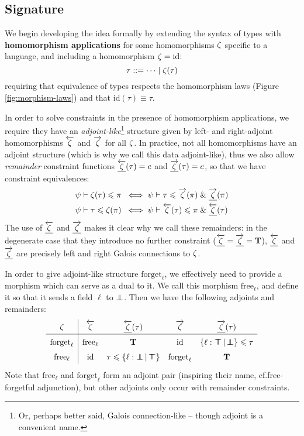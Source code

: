 \subsection{Signature}

We begin developing the idea formally by extending the syntax of types with \textbf{homomorphism applications} for some homomorphisms $\zeta$ specific to a language, and including a homomorphism $\zeta = \mathrm{id}$:
$$ \tau ::= \cdots \mid \zeta(\tau) $$
requiring that equivalence of types respects the homomorphism laws (Figure \ref{fig:morphism-laws}) and that $\mathrm{id}(\tau) \equiv \tau$. 

In order to solve constraints in the presence of homomorphism applications, we require they have an \emph{adjoint-like}\footnote{Or, perhaps better said, Galois connection-like -- though adjoint is a convenient name.} structure given by left- and right-adjoint homomorphisms $\overleftarrow{\zeta}$ and $\overrightarrow{\zeta}$ for all $\zeta$. In practice, not all homomorphisms have an adjoint structure (which is why we call this data adjoint-like), thus we also allow \emph{remainder} constraint functions $\underline{\overleftarrow{\zeta}}(\tau) = c$ and $\underline{\overrightarrow{\zeta}}(\tau) = c$, so that we have constraint equivalences:
\begin{align*}
\psi \vdash \zeta(\tau) \leqslant \pi &\;\iff \psi \vdash \tau \leqslant \overrightarrow{\zeta}(\pi) \;\&\; \underline{\overrightarrow{\zeta}}(\pi) \\
\psi \vdash \tau \leqslant \zeta(\pi) &\;\iff \psi \vdash \overleftarrow{\zeta}(\tau) \leqslant \pi \;\&\; \underline{\overleftarrow{\zeta}}(\tau)
\end{align*}
The use of $\underline{\overleftarrow{\zeta}}$ and $\underline{\overrightarrow{\zeta}}$ makes it clear why we call these remainders: in the degenerate case that they introduce no further constraint ($\underline{\overleftarrow{\zeta}} = \underline{\overrightarrow{\zeta}} = \mathbf T$), $\underline{\overleftarrow{\zeta}}$ and $\underline{\overrightarrow{\zeta}}$ are precisely left and right Galois connections to $\zeta$.

\begin{example}
    In order to give adjoint-like structure $\mathrm{forget}_\ell$, we effectively need to provide a morphism which can serve as a dual to it. We call this morphism $\mathrm{free}_\ell$, and define it so that it sends a field $\ell$ to $\bot \!\!\!\! \bot$. Then we have the following adjoints and remainders:
    $$\renewcommand\arraystretch{1.5}
    \begin{array}{c|cccc}
    \morph & \ladj \morph & \ladjrest \morph(\tau) & \radj \morph & \radjrest \morph(\tau) \\ \hline 
    \mathrm{forget}_\ell & \mathrm{free}_\ell & \tru & \mathrm{id} & \flext{\ell : \flftop}{\flfbot} \sub \tau \\
    \mathrm{free}_\ell & \mathrm{id} & \tau \sub \flext{\ell : \flfbot}{\flftop} & \mathrm{forget}_\ell & \tru
    \end{array}$$
    Note that $\mathrm{free}_\ell$ and $\mathrm{forget}_\ell$ form an adjoint pair (inspiring their name, cf.\@ free-forgetful adjunction), but other adjoints only occur with remainder constraints.
\end{example}

